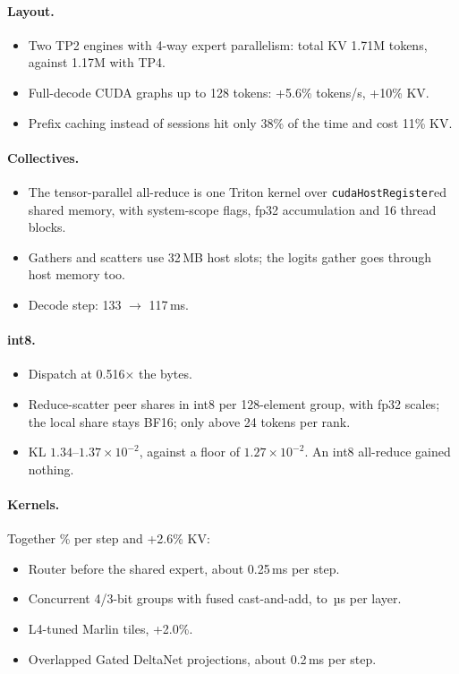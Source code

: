 \documentclass[10pt]{article}
\newcommand{\appminus}{\textminus}
\newcommand{\appminus}{\symbol{"2212}}
\newcommand{\mn}{\appminus}                     %
\begin{document}
\paragraph{Layout.}
\begin{itemize}
  \item Two TP2 engines with 4-way expert parallelism: total KV 1.71M tokens, against 1.17M with TP4.
  \item Full-decode CUDA graphs up to 128 tokens: +5.6\% tokens/s, +10\% KV.
  \item Prefix caching instead of sessions hit only 38\% of the time and cost 11\% KV.
\end{itemize}

\paragraph{Collectives.}
\begin{itemize}
  \item The tensor-parallel all-reduce is one Triton kernel over \texttt{cudaHostRegister}ed shared memory, with
        system-scope flags, fp32 accumulation and 16 thread blocks.
  \item Gathers and scatters use 32\,MB host slots; the logits gather goes through host memory too.
  \item Decode step: 133 $\rightarrow$ 117\,ms.
\end{itemize}

\paragraph{int8.}
\begin{itemize}
  \item Dispatch at 0.516× the bytes.
  \item Reduce-scatter peer shares in int8 per 128-element group, with fp32 scales; the local share stays BF16; only
        above 24 tokens per rank.
  \item KL $1.34$--$1.37\times10^{-2}$, against a floor of $1.27\times10^{-2}$. An int8 all-reduce gained nothing.
\end{itemize}

\paragraph{Kernels.} Together \mn3.7\% per step and +2.6\% KV:
\begin{itemize}
  \item Router before the shared expert, about 0.25\,ms per step.
  \item Concurrent 4/3-bit groups with fused cast-and-add, \mn36 to \mn51\,µs per layer.
  \item L4-tuned Marlin tiles, +2.0\%.
  \item Overlapped Gated DeltaNet projections, about 0.2\,ms per step.
\end{itemize}
\end{document}
